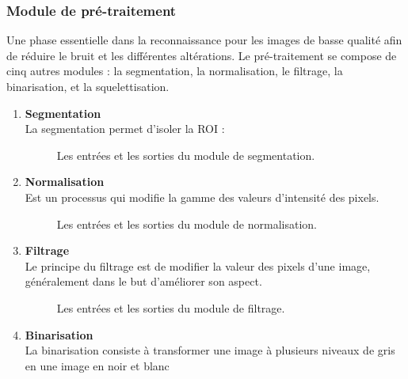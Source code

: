 \subsubsection{Module de pré-traitement}
Une phase essentielle dans la reconnaissance pour les images de basse qualité afin de réduire le bruit et les différentes altérations. Le pré-traitement se compose de cinq autres modules : la segmentation, la normalisation, le filtrage, la binarisation, et la squelettisation.
\begin{enumerate}
	\item \textbf{Segmentation}\\
	La segmentation permet d'isoler la ROI :
	
	\begin{figure}[H]
		\centering
		\caption{Les entrées et les sorties du module de segmentation.}
		\label{segmentModule}
	\end{figure}

	
	\item \textbf{Normalisation}\\
	Est un processus qui modifie la gamme des valeurs d'intensité des pixels.

		\begin{figure}[H]
			\centering
			
			\caption{Les entrées et les sorties du module de normalisation.}
			\label{normModule}
		\end{figure}

	
	\item\textbf{ Filtrage}\\
	Le principe du filtrage est de modifier la valeur des pixels d'une image, généralement dans le but d'améliorer son aspect. 

		\begin{figure}[H]
			\centering
			
			\caption{Les entrées et les sorties du module de filtrage.}
			\label{filterModule}
		\end{figure}
	
	\item\textbf{ Binarisation}\\
	La binarisation consiste à transformer une image à plusieurs niveaux de gris en une image en noir et blanc
 

\end{enumerate}

